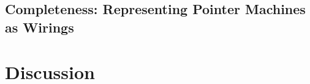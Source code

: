 	\subsection{Completeness: Representing Pointer Machines as Wirings}
	\label{subsec_completness}
	

\section*{Discussion}


\newpage



